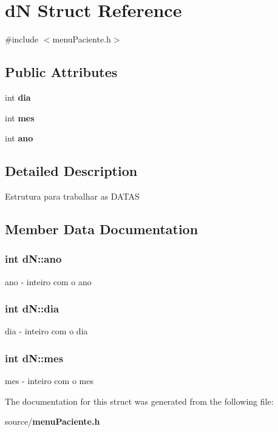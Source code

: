 \section{d\+N Struct Reference}
\label{structd_n}


{\ttfamily \#include $<$menu\+Paciente.\+h$>$}

\subsection*{Public Attributes}
\begin{DoxyCompactItemize}
\item 
int {\bf dia}
\item 
int {\bf mes}
\item 
int {\bf ano}
\end{DoxyCompactItemize}


\subsection{Detailed Description}
Estrutura para trabalhar as D\+A\+T\+A\+S 

\subsection{Member Data Documentation}
\subsubsection[{ano}]{\setlength{\rightskip}{0pt plus 5cm}int d\+N\+::ano}\label{structd_n_a9cfd974642c0cc2a8c7a68b01d957778}
ano -\/ inteiro com o ano 
\subsubsection[{dia}]{\setlength{\rightskip}{0pt plus 5cm}int d\+N\+::dia}\label{structd_n_a4de9a6a27d5828cd1affb5455d85a9c0}
dia -\/ inteiro com o dia 
\subsubsection[{mes}]{\setlength{\rightskip}{0pt plus 5cm}int d\+N\+::mes}\label{structd_n_a1a713ecec71dbb0bab0897f61c732e84}
mes -\/ inteiro com o mes 

The documentation for this struct was generated from the following file\+:\begin{DoxyCompactItemize}
\item 
source/{\bf menu\+Paciente.\+h}\end{DoxyCompactItemize}
